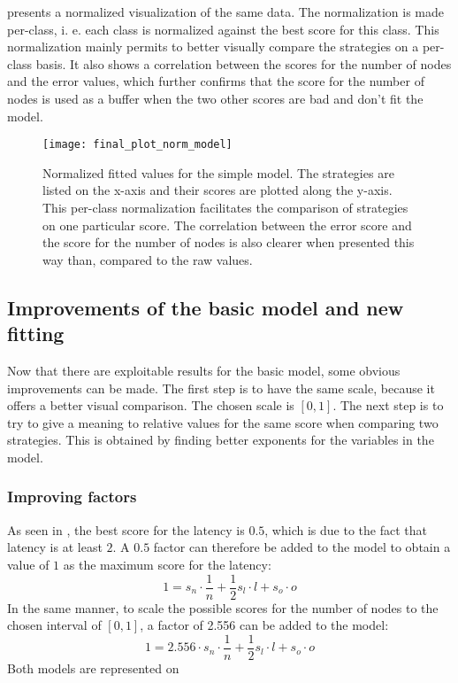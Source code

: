  presents a normalized visualization of the same
data. The normalization is made per-class, i. e. each class is normalized
against the best score for this class. This normalization mainly permits to
better visually compare the strategies on a per-class basis. It also shows a
correlation between the scores for the number of nodes and the error values,
which further confirms that the score for the number of nodes is used as a
buffer when the two other scores are bad and don't fit the model.


\begin{figure}[h]
    \centering
    \texttt{[image: final\_plot\_norm\_model]}
    \caption{Normalized fitted values for the simple model. The strategies are listed
    on the x-axis and their scores are plotted along the y-axis. 
    This per-class normalization facilitates the comparison of strategies on one
    particular score.
    The correlation between the error score and the score for the number of
    nodes is also clearer when presented this way than, compared to the raw
    values.
    }
    \label{fig:recapTestsPlotNorm}
\end{figure}

\FloatBarrier
\subsection{Improvements of the basic model and new fitting}
Now that there are exploitable results for the basic model, some obvious
improvements can be made. The first step is to have the same scale, because it
offers a better visual comparison. The chosen scale is \([0,1]\). The next step
is to try to give a meaning to relative values for the same score when comparing
two strategies. This is obtained by finding better exponents for the variables
in the model.

\subsubsection{Improving factors}
As seen in , the best score for
the latency is \(0.5\), which is due to the fact that latency is at least \(2\).
A \(0.5\) factor can therefore be added to the model to obtain a value of \(1\)
as the maximum score for the latency:
\[1 = s_n \cdot \frac{1}{n} + \frac{1}{2} s_l\cdot l + s_o\cdot o\]
In the same manner, to scale the possible scores for the number of nodes to the
chosen interval of \([0,1]\), a factor of 2.556 can be added to the model:
\[1 = 2.556\cdot s_n \cdot \frac{1}{n} + \frac{1}{2} s_l\cdot l + s_o\cdot o\]
Both models are represented on 

